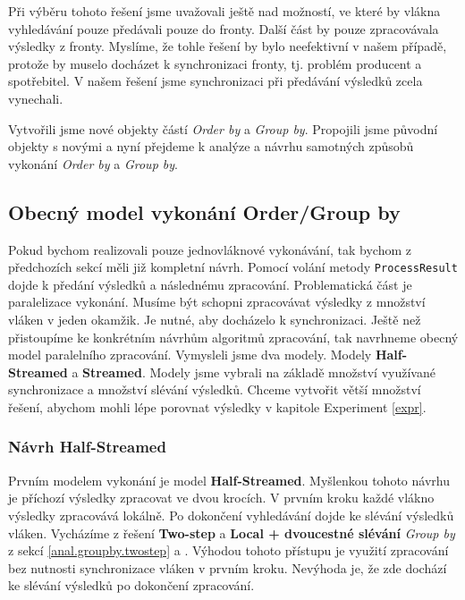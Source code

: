 Při výběru tohoto řešení jsme uvažovali ještě nad možností, ve které by vlákna vyhledávání pouze předávali pouze do fronty.
Další část by pouze zpracovávala výsledky z fronty.
Myslíme, že tohle řešení by bylo neefektivní v našem případě, protože by muselo docházet k synchronizaci fronty, tj. problém producent a spotřebitel.
V našem řešení jsme synchronizaci při předávání výsledků zcela vynechali.

Vytvořili jsme nové objekty částí \textit{Order by} a \textit{Group by}.
Propojili jsme původní objekty s novými a nyní přejdeme k analýze a návrhu samotných způsobů vykonání \textit{Order by} a \textit{Group by}.

\subsection{Obecný model vykonání Order/Group by}

Pokud bychom realizovali pouze jednovláknové vykonávání, tak bychom z předchozích sekcí měli již kompletní návrh.
Pomocí volání metody \texttt{ProcessResult} dojde k předání výsledků a následnému zpracování.
Problematická část je paralelizace vykonání.
Musíme být schopni zpracovávat výsledky z množství vláken v jeden okamžik.
Je nutné, aby docházelo k synchronizaci.
Ještě než přistoupíme ke konkrétním návrhům algoritmů zpracování, tak navrhneme obecný model paralelního zpracování.
Vymysleli jsme dva modely.
Modely \textbf{Half-Streamed} a \textbf{Streamed}.
Modely jsme vybrali na základě množství využívané synchronizace a množství slévání výsledků.
Chceme vytvořit větší množství řešení, abychom mohli lépe porovnat výsledky v kapitole Experiment \ref{expr}.

\subsubsection{Návrh Half-Streamed}

Prvním modelem vykonání je model \textbf{Half-Streamed}.
Myšlenkou tohoto návrhu je příchozí výsledky zpracovat ve dvou krocích.
V prvním kroku každé vlákno výsledky zpracovává lokálně.
Po dokončení vyhledávání dojde ke slévání výsledků vláken.
Vycházíme z řešení \textbf{Two-step} a \textbf{Local + dvoucestné slévání} \textit{Group by} z sekcí \ref{anal.groupby.twostep} a \label{anal.groupby.local}.
Výhodou tohoto přístupu je využití zpracování bez nutnosti synchronizace vláken v prvním kroku.
Nevýhoda je, že zde dochází ke slévání výsledků po dokončení zpracování.

